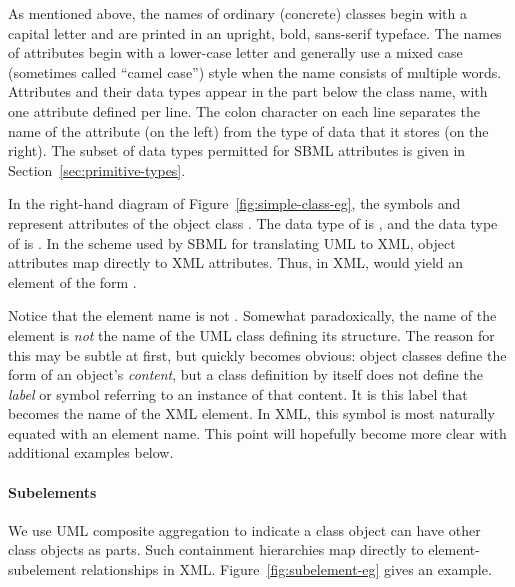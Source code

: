 As mentioned above, the names of ordinary (concrete) classes begin
with a capital letter and are printed in an upright,
bold, sans-serif typeface.  The names of attributes
begin with a lower-case letter and generally use a mixed case
(sometimes called ``camel case'') style when the name consists of
multiple words.  Attributes and their data types appear in the
part below the class name, with one attribute defined per line.
The colon character on each line separates the name of the
attribute (on the left) from the type of data that it stores (on
the right).  The subset of data types permitted for SBML
attributes is given in Section~\ref{sec:primitive-types}.

In the right-hand diagram of Figure~\ref{fig:simple-class-eg}, the
symbols  and  represent
attributes of the object class .  The data
type of  is , and the data type of
 is .  In the scheme used
by SBML for translating UML to XML, object attributes map directly
to XML attributes.  Thus, in XML,  would yield
an element of the form .

Notice that the element name is not .
Somewhat paradoxically, the name of the element is \emph{not} the
name of the UML class defining its structure.  The reason for this
may be subtle at first, but quickly becomes obvious: object
classes define the form of an object's \emph{content}, but a class
definition by itself does not define the \emph{label} or symbol
referring to an instance of that content.  It is this label that
becomes the name of the XML element.  In XML, this symbol is most
naturally equated with an element name.  This point will hopefully
become more clear with additional examples below.


\paragraph{Subelements}

We use UML composite aggregation to indicate a class object can
have other class objects as parts.  Such containment hierarchies
map directly to element-subelement relationships in XML.
Figure~\ref{fig:subelement-eg} gives an example.

